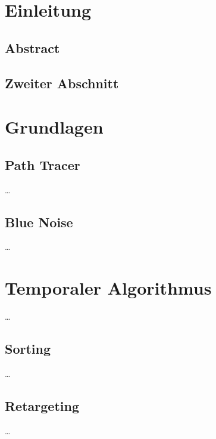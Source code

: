 
\chapter{Einleitung}
\label{ch:Introduction}

\section{Abstract}

\section{Zweiter Abschnitt}


\chapter{Grundlagen}
\label{ch:Grundlagen}


\section{Path Tracer}
\label{ch:Content1:sec:Path Tracer}


\dots


\section{Blue Noise}
\label{ch:Content1:sec:BlueNoise}


\dots



\chapter{Temporaler Algorithmus}
\label{ch:Content2}

\dots


\section{Sorting}
\label{ch:Content2:sec:Sorting}


\dots


\section{Retargeting}
\label{ch:Content2:sec:Retargeting}


\dots
